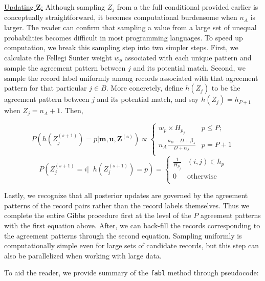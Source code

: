 \documentclass[12pt,letterpaper]{article}
\newcommand{\1}[1]{\mathbb{I}\!\left[#1\right]} %
\begin{document}
\underline{Updating $\mathbf{Z}$:} Although sampling \(Z_j\) from a the
full conditional provided earlier is conceptually straightforward, it
becomes computational burdensome when \(n_A\) is larger. The reader can
confirm that sampling a value from a large set of unequal probabilities
becomes difficult in most programming languages. To speed up
computation, we break this sampling step into two simpler steps. First,
we calculate the Fellegi Sunter weight \(w_{p}\) associated with each
unique pattern and sample the agreement pattern between \(j\) and its
potential match. Second, we sample the record label uniformly among
records associated with that agreement pattern for that particular
\(j\in B\). More concretely, define \(h(Z_j)\) to be the agreement
pattern between \(j\) and its potential match, and say
\(h(Z_j) = h_{P+1}\) when \(Z_j = n_A + 1\). Then,

\[P\left(h\left(Z_j^{(s+1)}\right) = p | \mathbf{m}, \mathbf{u}, \mathbf{Z^{(s)}}\right) \propto
\begin{cases} 
	w_{p}\times H_{p_j}  & p \leq P; \\
	n_A \frac{n_B - D + \beta_{\lambda}}{D + \alpha_{\lambda}} &   p = P + 1 \\
\end{cases}\]
\[P\left(Z_j^{(s+1)} = i\bigg|\;\; h\left(Z_j^{(s+1)}\right) = p\right) = \begin{cases} 
	\frac{1}{H_{p_j}} & (i, j) \in h_p \\
	0 & \text{otherwise} \\
\end{cases}\]

Lastly, we recognize that all posterior updates are governed by the
agreement patterns of the record pairs rather than the record labels
themselves. Thus we complete the entire Gibbs procedure first at the
level of the \(P\) agreement patterns with the first equation above.
After, we can back-fill the records corresponding to the agreement
patterns through the second equation. Sampling uniformly is
computationally simple even for large sets of candidate records, but this
step can also be parallelized when working with large data.

To aid the reader, we provide summary of the \texttt{fabl} method through pseudocode:
\end{document}
